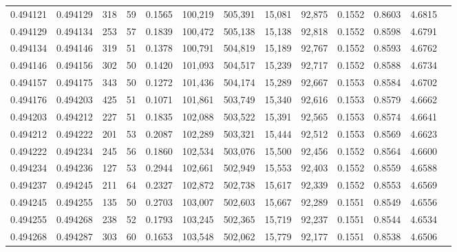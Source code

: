 \begin{tabular}{rrrrrrrrrrrrr}
0.494121 & 0.494129 & 318 &  59 &                                     0.1565 & 100,219 & 505,391 &  15,081 &  92,875 & 0.1552 & 0.8603 & 4.6815 \\
0.494129 & 0.494134 & 253 &  57 &                                     0.1839 & 100,472 & 505,138 &  15,138 &  92,818 & 0.1552 & 0.8598 & 4.6791 \\
0.494134 & 0.494146 & 319 &  51 &                                     0.1378 & 100,791 & 504,819 &  15,189 &  92,767 & 0.1552 & 0.8593 & 4.6762 \\
0.494146 & 0.494156 & 302 &  50 &                                     0.1420 & 101,093 & 504,517 &  15,239 &  92,717 & 0.1552 & 0.8588 & 4.6734 \\
0.494157 & 0.494175 & 343 &  50 &                                     0.1272 & 101,436 & 504,174 &  15,289 &  92,667 & 0.1553 & 0.8584 & 4.6702 \\
0.494176 & 0.494203 & 425 &  51 &                                     0.1071 & 101,861 & 503,749 &  15,340 &  92,616 & 0.1553 & 0.8579 & 4.6662 \\
0.494203 & 0.494212 & 227 &  51 &                                     0.1835 & 102,088 & 503,522 &  15,391 &  92,565 & 0.1553 & 0.8574 & 4.6641 \\
0.494212 & 0.494222 & 201 &  53 &                                     0.2087 & 102,289 & 503,321 &  15,444 &  92,512 & 0.1553 & 0.8569 & 4.6623 \\
0.494222 & 0.494234 & 245 &  56 &                                     0.1860 & 102,534 & 503,076 &  15,500 &  92,456 & 0.1552 & 0.8564 & 4.6600 \\
0.494234 & 0.494236 & 127 &  53 &                                     0.2944 & 102,661 & 502,949 &  15,553 &  92,403 & 0.1552 & 0.8559 & 4.6588 \\
0.494237 & 0.494245 & 211 &  64 &                                     0.2327 & 102,872 & 502,738 &  15,617 &  92,339 & 0.1552 & 0.8553 & 4.6569 \\
0.494245 & 0.494255 & 135 &  50 &                                     0.2703 & 103,007 & 502,603 &  15,667 &  92,289 & 0.1551 & 0.8549 & 4.6556 \\
0.494255 & 0.494268 & 238 &  52 &                                     0.1793 & 103,245 & 502,365 &  15,719 &  92,237 & 0.1551 & 0.8544 & 4.6534 \\
0.494268 & 0.494287 & 303 &  60 &                                     0.1653 & 103,548 & 502,062 &  15,779 &  92,177 & 0.1551 & 0.8538 & 4.6506 \\

\end{tabular}
